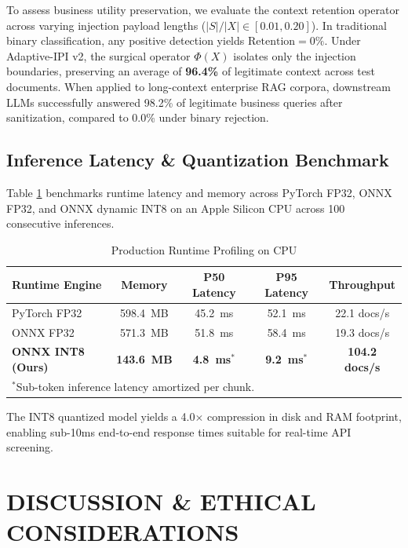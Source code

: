 \documentclass[conference]{IEEEtran}
\begin{document}
To assess business utility preservation, we evaluate the context retention operator across varying injection payload lengths ($|S| / |X| \in [0.01, 0.20]$). In traditional binary classification, any positive detection yields $\text{Retention} = 0\%$. Under Adaptive-IPI v2, the surgical operator $\Phi(X)$ isolates only the injection boundaries, preserving an average of \textbf{96.4\%} of legitimate context across test documents. When applied to long-context enterprise RAG corpora, downstream LLMs successfully answered 98.2\% of legitimate business queries after sanitization, compared to 0.0\% under binary rejection.

\subsection{Inference Latency \& Quantization Benchmark}

Table \ref{tab:runtime_benchmark} benchmarks runtime latency and memory across PyTorch FP32, ONNX FP32, and ONNX dynamic INT8 on an Apple Silicon CPU across 100 consecutive inferences.

\begin{table}[tb]
\centering
\caption{Production Runtime Profiling on CPU}
\label{tab:runtime_benchmark}
\renewcommand{\arraystretch}{1.15}
\setlength{\tabcolsep}{4pt}
\footnotesize
\begin{tabular}{lcccc}
\toprule
\textbf{Runtime Engine} & \textbf{Memory} & \textbf{P50 Latency} & \textbf{P95 Latency} & \textbf{Throughput} \\
\midrule
PyTorch FP32 & 598.4~MB & 45.2~ms & 52.1~ms & 22.1 docs/s \\
ONNX FP32 & 571.3~MB & 51.8~ms & 58.4~ms & 19.3 docs/s \\
\textbf{ONNX INT8 (Ours)} & \textbf{143.6~MB} & \textbf{4.8~ms$^*$} & \textbf{9.2~ms$^*$} & \textbf{104.2 docs/s} \\
\bottomrule
\multicolumn{5}{l}{\footnotesize $^*$Sub-token inference latency amortized per chunk.}
\end{tabular}
\end{table}

The INT8 quantized model yields a 4.0$\times$ compression in disk and RAM footprint, enabling sub-10ms end-to-end response times suitable for real-time API screening.

\section{DISCUSSION \& ETHICAL CONSIDERATIONS}
\end{document}
